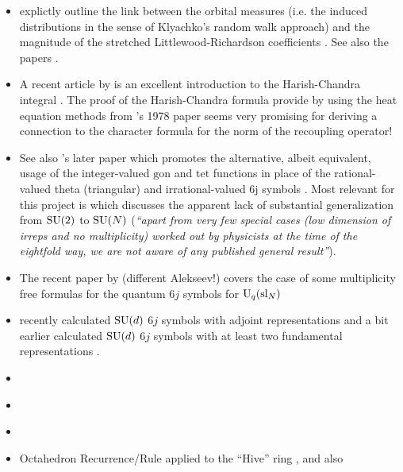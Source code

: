 \documentclass[notitlepage, 10pt]{article}
\begin{document}
\begin{itemize}
    \item {} explictly outline the link between the orbital measures (i.e. the induced distributions in the sense of Klyachko's random walk approach) and the magnitude of the stretched Littlewood-Richardson coefficients \cite{coquereaux2018orbital}. See also the papers \cite{coquereaux2020horn,coquereaux2019revisiting,zuber2018horn}.
    \item A recent article by \citeauthor{mcswiggen2021harish} is an excellent introduction to the Harish-Chandra integral \cite{mcswiggen2021harish}. The proof of the Harish-Chandra formula provide by \citeauthor{mcswiggen2021harish} using the heat equation methods from \citeauthor{fegan1978heat}'s 1978 paper \cite{fegan1978heat} seems very promising for deriving a connection to the character formula for the norm of the recoupling operator!
    \item See also 's later paper which promotes the alternative, albeit equivalent, usage of the integer-valued $\mathrm{gon}$ and $\mathrm{tet}$ functions in place of the rational-valued theta (triangular) and irrational-valued 6j symbols \cite{coquereaux2023integer}. Most relevant for this project is \cite[Section IV D]{coquereaux2023integer} which discusses the apparent lack of substantial generalization from $\operatorname{SU}(2)$ to $\operatorname{SU}(N)$ (\textit{``apart from very few special cases (low dimension of irreps and no multiplicity) worked out by physicists at the time of the eightfold way, we are not aware of any published general result''}).
    \item The recent paper by \citeauthor{alekseev2020multiplicity} (different Alekseev!) covers the case of some multiplicity free formulas for the quantum $6j$ symbols for $\operatorname{U}_q(\mathrm{sl}_{N})$ \cite{alekseev2020multiplicity}
    \item \citeauthor{keppeler2024wigner} recently calculated $\operatorname{SU}(d)$ $6j$ symbols with adjoint representations \cite{keppeler2024wigner} and a bit earlier \cite{alcock2023wigner} calculated $\operatorname{SU}(d)$ $6j$ symbols with at least two fundamental representations \cite{alcock2023wigner}.
    \item \citeauthor{boalch2007regge} \cite{boalch2007regge}
    \item \citeauthor{taylor2006sixj} \cite{taylor2006sixj}
    \item \citeauthor{henriques2005crystals} \cite{henriques2005crystals}
    \item Octahedron Recurrence/Rule \citeauthor{robbins1986determinants} \cite{robbins1986determinants} applied to the ``Hive'' ring \citeauthor{knutson2003positive} \cite{knutson2003positive}, and also \citeauthor{henriques2006octahedron} \cite{henriques2006octahedron}

\end{itemize}
\end{document}
